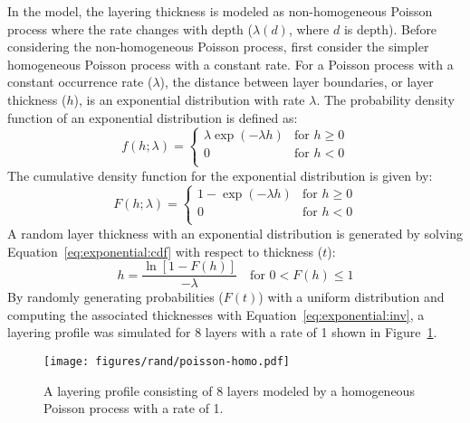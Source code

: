 \documentclass[12pt,oneside]{book}
\begin{document}
In the \citet{toro:95} model, the layering thickness is modeled as non-homogeneous Poisson process
where the rate changes with depth ($\lambda(d)$, where $d$ is depth).  Before considering the
non-homogeneous Poisson process, first consider the simpler homogeneous Poisson process with a
constant rate.  For a Poisson process with a constant occurrence rate ($\lambda$), the distance
between layer boundaries, or layer thickness ($h$), is an exponential distribution with rate
$\lambda$.  The probability density function of an exponential distribution is defined as:
\begin{equation}
    f(h;\lambda) = 
    \left\{
        \begin{array}{ll}
            \lambda \exp(-\lambda h) & \text{for } h \ge 0 \\
            0 & \text{for } h < 0 \\
        \end{array}
    \right.
    \label{eq:exponential:pdf}
\end{equation}
The cumulative density function for the exponential distribution is given by:
\begin{equation}
    F(h;\lambda) = 
    \left\{
        \begin{array}{ll}
            1- \exp(-\lambda h) & \text{for } h \ge 0 \\
            0 & \text{for } h < 0 \\
        \end{array}
    \right.
    \label{eq:exponential:cdf}
\end{equation}
A random layer thickness with an exponential distribution is generated by solving
Equation~\ref{eq:exponential:cdf} with respect to thickness ($t$):
\begin{equation}
    h = \frac{\ln\left[1-F(h)\right]}{-\lambda} \quad \text{for } 0 < F(h) \le 1
    \label{eq:exponential:inv}
\end{equation}
By randomly generating probabilities ($F(t)$) with a uniform distribution and computing the
associated thicknesses with Equation~\ref{eq:exponential:inv}, a layering profile was simulated for
8 layers with a rate of 1 shown in Figure~\ref{fig:rand:poisson:homo}.

\begin{figure}[tb]
    \begin{center}
        \texttt{[image: figures/rand/poisson-homo.pdf]}
    \end{center}
    \caption{A layering profile consisting of 8 layers modeled by a homogeneous Poisson process with a rate of 1.}
    \label{fig:rand:poisson:homo}
\end{figure}
\end{document}
